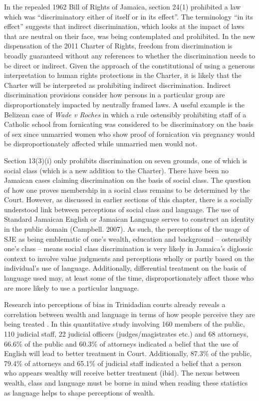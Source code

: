 \documentclass[output=paper,colorlinks,citecolor=brown]{langscibook}
\begin{document}
In the repealed 1962 Bill of Rights of Jamaica, section 24(1) prohibited a law which was “discriminatory either of itself or in its effect”. The terminology “in its effect” suggests that indirect discrimination, which looks at the impact of laws that are neutral on their face, was being contemplated and prohibited. In the new dispensation of the 2011 Charter of Rights, freedom from discrimination is broadly guaranteed without any references to whether the discrimination needs to be direct or indirect. Given the approach of the constitutional of using a generous interpretation to human rights protections in the Charter, it is likely that the Charter will be interpreted as prohibiting indirect discrimination. Indirect discrimination provisions consider how persons in a particular group are disproportionately impacted by neutrally framed laws. A useful example is the Belizean case of \textit{Wade v Roches} in which a rule ostensibly prohibiting staff of a Catholic school from fornicating was considered to be discriminatory on the basis of sex since unmarried women who show proof of fornication via pregnancy would be disproportionately affected while unmarried men would not. 

Section 13(3)(i) only prohibits discrimination on seven grounds, one of which is social class (which is a new addition to the Charter). There have been no Jamaican cases claiming discrimination on the basis of social class. The question of how one proves membership in a social class remains to be determined by the Court. However, as discussed in earlier sections of this chapter, there is a socially understood link between perceptions of social class and language. The use of Standard Jamaican English or Jamaican Language serves to construct an identity in the public domain (Campbell. 2007). As such, the perceptions of the usage of SJE as being emblematic of one’s wealth, education and background -- ostensibly one’s class -- means social class discrimination is very likely in Jamaica’s diglossic context to involve value judgments and perceptions wholly or partly based on the individual’s use of language. Additionally, differential treatment on the basis of language used may, at least some of the time, disproportionately affect those who are more likely to use a particular language. 

Research into perceptions of bias in Trinidadian courts already reveals a correlation between wealth and language in terms of how people perceive they are being treated \citep{Kerrigan-etal-2019}. In this quantitative study involving 160 members of the public, 110 judicial staff, 22 judicial officers (judges/magistrates etc.) and 68 attorneys, 66.6\% of the public and 60.3\% of attorneys indicated a belief that the use of English will lead to better treatment in Court. Additionally, 87.3\% of the public, 79.4\% of attorneys and 65.1\% of judicial staff indicated a belief that a person who appears wealthy will receive better treatment (ibid). The nexus between wealth, class and language must be borne in mind when reading these statistics as language helps to shape perceptions of wealth. 
\end{document}
